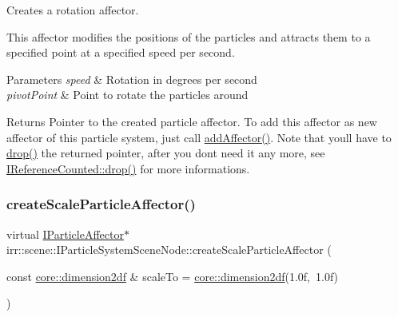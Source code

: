 Creates a rotation affector. 

This affector modifies the positions of the particles and attracts them to a specified point at a specified speed per second. 
\begin{DoxyParams}{Parameters}
{\em speed} & Rotation in degrees per second \\
\hline
{\em pivot\+Point} & Point to rotate the particles around \\
\hline
\end{DoxyParams}
\begin{DoxyReturn}{Returns}
Pointer to the created particle affector. To add this affector as new affector of this particle system, just call \hyperlink{classirr_1_1scene_1_1IParticleSystemSceneNode_a401f5afbbb748878011c5ceb7d447f8b}{add\+Affector()}. Note that you\textquotesingle{}ll have to \hyperlink{classirr_1_1IReferenceCounted_a03856a09355b89d178090c4a5f738543}{drop()} the returned pointer, after you don\textquotesingle{}t need it any more, see \hyperlink{classirr_1_1IReferenceCounted_a03856a09355b89d178090c4a5f738543}{I\+Reference\+Counted\+::drop()} for more informations. 
\end{DoxyReturn}
\mbox{\label{classirr_1_1scene_1_1IParticleSystemSceneNode_a015692bb57e0b6dfff1de96975b3bc74}} 
\subsubsection{\texorpdfstring{create\+Scale\+Particle\+Affector()}{createScaleParticleAffector()}\hspace{0.1cm}{\footnotesize\ttfamily [1/2]}}
{\footnotesize\ttfamily virtual \hyperlink{classirr_1_1scene_1_1IParticleAffector}{I\+Particle\+Affector}$\ast$ irr\+::scene\+::\+I\+Particle\+System\+Scene\+Node\+::create\+Scale\+Particle\+Affector (\begin{DoxyParamCaption}\item[{const \hyperlink{namespaceirr_1_1core_a54f0e5b7416e6dce5a0f6213f00a580f}{core\+::dimension2df} \&}]{scale\+To = {\ttfamily \hyperlink{namespaceirr_1_1core_a54f0e5b7416e6dce5a0f6213f00a580f}{core\+::dimension2df}(1.0f,~1.0f)} }\end{DoxyParamCaption})\hspace{0.3cm}{\ttfamily [pure virtual]}}



